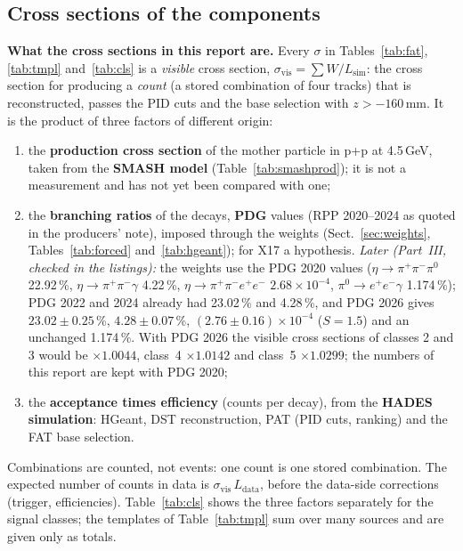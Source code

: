 \documentclass[11pt,a4paper]{article}
\newcommand{\piz}{\ensuremath{\pi^{0}}\xspace}
\newcommand{\ee}{\ensuremath{e^{+}e^{-}}\xspace}
\newcommand{\pipi}{\ensuremath{\pi^{+}\pi^{-}}\xspace}
\newcommand{\ppee}{\ensuremath{\pi^{+}\pi^{-}e^{+}e^{-}}\xspace}
\newcommand{\Lsim}{\ensuremath{L_{\mathrm{sim}}}\xspace}
\newcommand{\Ldata}{\ensuremath{L_{\mathrm{data}}}\xspace}
\begin{document}
\subsection{Cross sections of the components}
\label{sec:xsec}
\textbf{What the cross sections in this report are.} Every $\sigma$ in Tables~\ref{tab:fat},
\ref{tab:tmpl} and~\ref{tab:cls} is a \emph{visible} cross section,
$\sigma_{\mathrm{vis}} = \sum W/\Lsim$: the cross section for producing a \emph{count} (a stored combination
of four tracks) that is reconstructed, passes the PID cuts and the base selection with
$z>-160$\,mm. It is the product of three factors of different origin:
\begin{enumerate}
\item the \textbf{production cross section} of the mother particle in p+p at 4.5\,GeV, taken from
      the \textbf{SMASH model} (Table~\ref{tab:smashprod}); it is not a measurement and has not yet
      been compared with one;
\item the \textbf{branching ratios} of the decays, \textbf{PDG} values (RPP 2020--2024 as quoted in the
      producers' note), imposed through the weights (Sect.~\ref{sec:weights},
      Tables~\ref{tab:forced} and~\ref{tab:hgeant}); for X17 a hypothesis. \emph{Later (Part~III, checked in the
      listings):} the weights use the PDG 2020 values ($\eta\to\pipi\piz$ 22.92\,\%, $\eta\to\pipi\gamma$ 4.22\,\%,
      $\eta\to\ppee$ $2.68\times10^{-4}$, $\piz\to\ee\gamma$ 1.174\,\%); PDG 2022 and 2024 already had 23.02\,\% and 4.28\,\%,
      and PDG 2026 gives $23.02\pm0.25$\,\%, $4.28\pm0.07$\,\%, $(2.76\pm0.16)\times10^{-4}$ ($S=1.5$) and an unchanged
      1.174\,\%. With PDG 2026 the visible cross sections of classes 2 and 3 would be $\times1.0044$, class~4 $\times1.0142$
      and class~5 $\times1.0299$; the numbers of this report are kept with PDG 2020;
\item the \textbf{acceptance times efficiency} (counts per decay), from the \textbf{HADES simulation}:
      HGeant, DST reconstruction, PAT (PID cuts, ranking) and the FAT base selection.
\end{enumerate}
Combinations are counted, not events: one count is one stored combination. The expected number of counts in data is $\sigma_{\mathrm{vis}}\,\Ldata$,
before the data-side corrections (trigger, efficiencies). Table~\ref{tab:cls} shows the three
factors separately for the signal classes; the templates of Table~\ref{tab:tmpl} sum over many
sources and are given only as totals.
\end{document}
